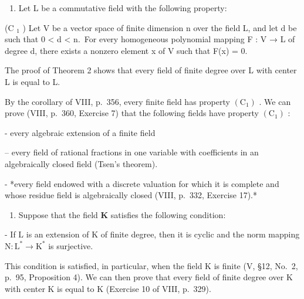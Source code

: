 \begin{enumerate}
\def\labelenumi{\arabic{enumi})}
\setcounter{enumi}{1}
\tightlist
\item
  Let L be a commutative field with the following property:
\end{enumerate}

(C \(_{1}\) ) Let V be a vector space of finite dimension n over the field L, and let d be such that 0 \textless{} d \textless{} n.~For every homogeneous polynomial mapping F : V → L of degree d, there exists a nonzero element x of V such that F(x) = 0.

The proof of Theorem 2 shows that every field of finite degree over L with center L is equal to L.

By the corollary of VIII, p.~356, every finite field has property \((\mathrm{C}_{1})\) . We can prove (VIII, p.~360, Exercise 7) that the following fields have property \((\mathrm{C}_{1})\) :

- every algebraic extension of a finite field

-- every field of rational fractions in one variable with coefficients in an algebraically closed field (Tsen's theorem).

- *every field endowed with a discrete valuation for which it is complete and whose residue field is algebraically closed (VIII, p.~332, Exercise 17).*

\begin{enumerate}
\def\labelenumi{\arabic{enumi})}
\setcounter{enumi}{2}
\tightlist
\item
  Suppose that the field \(\mathbf{K}\) satisfies the following condition:
\end{enumerate}

- If \(\mathrm{L}\) is an extension of \(\mathrm{K}\) of finite degree, then it is cyclic and the norm mapping \(\mathrm{N}:\mathrm{L}^{*}\to \mathrm{K}^{*}\) is surjective.

This condition is satisfied, in particular, when the field K is finite (V, §12, No.~2, p.~95, Proposition 4). We can then prove that every field of finite degree over K with center K is equal to K (Exercise 10 of VIII, p.~329).

